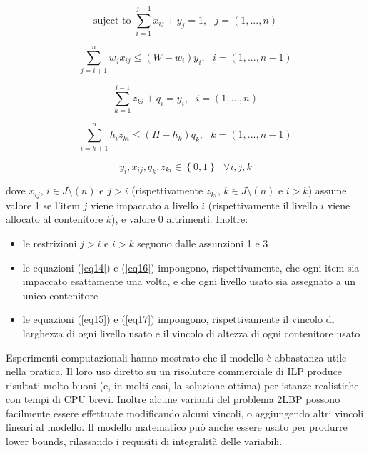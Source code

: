 \documentclass[12pt,a4paper,openright,twoside]{report}
\begin{document}
\begin{equation}\label{eq14}
\mbox{suject to } \sum_{i=1}^{j-1} x_{ij}+y_{j} = 1 , \mbox{  } j = (1,...,n)
\end{equation}

\begin{equation}\label{eq15}
\sum_{j=i+1}^{n} w_{j}x_{ij} \leq (W - w_{i})y_{i} , \mbox{  } i = (1,...,n-1)
\end{equation}

\begin{equation}\label{eq16}
\sum_{k=1}^{i-1} z_{ki}+ q_{i} = y_{i} , \mbox{  } i = (1,...,n)
\end{equation}

\begin{equation}\label{eq17}
\sum_{i=k+1}^{n} h_{i}z_{ki} \leq (H - h_{k})q_{k} , \mbox{  } k = (1,...,n-1)
\end{equation}

\begin{equation}\label{eq18}
y_{i}, x_{ij}, q_{k}, z_{ki} \in \left\lbrace 0,1 \right\rbrace \mbox{ } \forall i, j, k
\end{equation}

dove $x_{ij}$, $i \in J \setminus (n)$ e $j > i$ (rispettivamente $z_{ki}$, $k \in J \setminus (n)$ e $i > k$) assume valore 1 se l'item $j$ viene impaccato a livello $i$ (rispettivamente il livello $i$ viene allocato al contenitore $k$), e valore 0 altrimenti. Inoltre:
\begin{itemize}
\item le restrizioni $j > i$ e $ i > k$ seguono dalle assunzioni 1 e 3
\item le equazioni (\ref{eq14}) e (\ref{eq16}) impongono, rispettivamente, che ogni item sia impaccato esattamente una volta, e che ogni livello usato sia assegnato a un unico contenitore
\item le equazioni (\ref{eq15}) e (\ref{eq17}) impongono, rispettivamente il vincolo di larghezza di ogni livello usato e il vincolo di altezza di ogni contenitore usato
\end{itemize}
Esperimenti computazionali hanno mostrato che il modello \`{e} abbastanza utile nella pratica. Il loro uso diretto su un risolutore commerciale di ILP produce risultati molto buoni (e, in molti casi, la soluzione ottima) per istanze realistiche con tempi di CPU brevi. Inoltre alcune varianti del problema 2LBP possono facilmente essere effettuate modificando alcuni vincoli, o aggiungendo altri vincoli lineari al modello. Il modello matematico pu\`{o} anche essere usato per produrre lower bounds, rilassando i requisiti di integralit\`{a} delle variabili.
\end{document}
